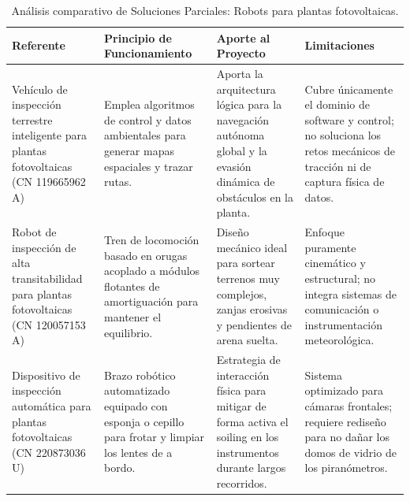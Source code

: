 \begin{table}[H]
	\centering
	\footnotesize
	\caption{Análisis comparativo de Soluciones Parciales: Robots para plantas fotovoltaicas.}
	\label{tab:estado_arte_robots_pv}
	\begin{tabularx}{\textwidth}{|p{3.5cm}|>{\raggedright\arraybackslash}X|>{\raggedright\arraybackslash}X|>{\raggedright\arraybackslash}X|}
		\hline
		\rowcolor[HTML]{D9E1F2} 
		\textbf{Referente} & \textbf{Principio de Funcionamiento} & \textbf{Aporte al Proyecto} & \textbf{Limitaciones} \\ \hline
		Vehículo de inspección terrestre inteligente para plantas fotovoltaicas (CN 119665962 A) & Emplea algoritmos de control y datos ambientales para generar mapas espaciales y trazar rutas. & Aporta la arquitectura lógica para la navegación autónoma global y la evasión dinámica de obstáculos en la planta. & Cubre únicamente el dominio de software y control; no soluciona los retos mecánicos de tracción ni de captura física de datos. \\ \hline
		Robot de inspección de alta transitabilidad para plantas fotovoltaicas (CN 120057153 A) & Tren de locomoción basado en orugas acoplado a módulos flotantes de amortiguación para mantener el equilibrio. & Diseño mecánico ideal para sortear terrenos muy complejos, zanjas erosivas y pendientes de arena suelta. & Enfoque puramente cinemático y estructural; no integra sistemas de comunicación o instrumentación meteorológica. \\ \hline
		Dispositivo de inspección automática para plantas fotovoltaicas (CN 220873036 U) & Brazo robótico automatizado equipado con esponja o cepillo para frotar y limpiar los lentes de a bordo. & Estrategia de interacción física para mitigar de forma activa el soiling en los instrumentos durante largos recorridos. & Sistema optimizado para cámaras frontales; requiere rediseño para no dañar los domos de vidrio de los piranómetros. \\ \hline
	\end{tabularx}
\end{table}

